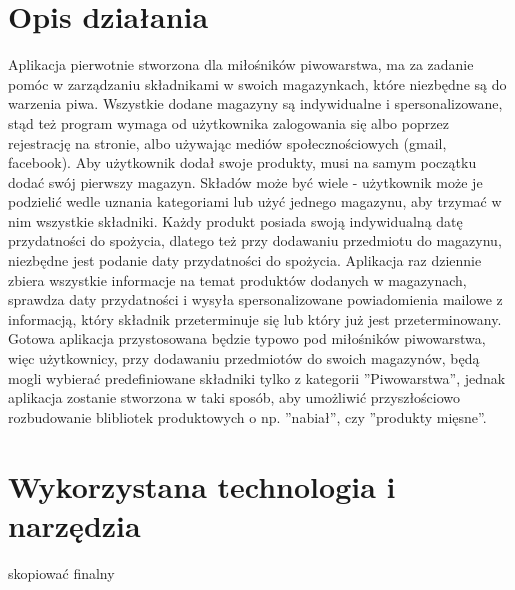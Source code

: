 \documentclass[12pt,a4paper]{article}
\begin{document}
	\section{Opis działania}

	\indent Aplikacja pierwotnie stworzona dla miłośników piwowarstwa, ma za zadanie pomóc w zarządzaniu składnikami w swoich magazynkach, które niezbędne są do warzenia piwa. 
Wszystkie dodane magazyny są indywidualne i spersonalizowane, stąd też program wymaga od użytkownika zalogowania się albo poprzez rejestrację na stronie, albo używając mediów społecznościowych (gmail, facebook).
Aby użytkownik dodał swoje produkty, musi na samym początku dodać swój pierwszy magazyn. Składów może być wiele - użytkownik może je podzielić wedle uznania kategoriami lub użyć jednego magazynu, aby trzymać w nim wszystkie składniki.
\newline \indent Każdy produkt posiada swoją indywidualną datę przydatności do spożycia, dlatego też przy dodawaniu przedmiotu do magazynu, niezbędne jest podanie daty przydatności do spożycia. 
\newline \newline \indent Aplikacja raz dziennie zbiera wszystkie informacje na temat produktów dodanych w magazynach, sprawdza daty przydatności i wysyła spersonalizowane powiadomienia mailowe z informacją, który składnik przeterminuje się lub który już jest przeterminowany. 
\newline \newline \indent Gotowa aplikacja przystosowana będzie typowo pod miłośników piwowarstwa, więc użytkownicy, przy dodawaniu przedmiotów do swoich magazynów, będą mogli wybierać predefiniowane składniki tylko z kategorii ''Piwowarstwa'', jednak aplikacja zostanie stworzona w taki sposób, aby umożliwić przyszłościowo rozbudowanie blibliotek produktowych o np. ''nabiał'', czy ''produkty mięsne''.
	\newpage
	\section{Wykorzystana technologia i narzędzia}
	\indent skopiować finalny
	\newpage

\end{document}
